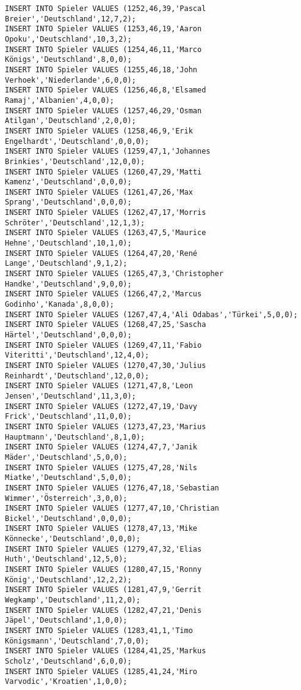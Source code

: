 \documentclass{bschlangaul-aufgabe}
\begin{document}
\begin{verbatim}
INSERT INTO Spieler VALUES (1252,46,39,'Pascal Breier','Deutschland',12,7,2);
INSERT INTO Spieler VALUES (1253,46,19,'Aaron Opoku','Deutschland',10,3,2);
INSERT INTO Spieler VALUES (1254,46,11,'Marco Königs','Deutschland',8,0,0);
INSERT INTO Spieler VALUES (1255,46,18,'John Verhoek','Niederlande',6,0,0);
INSERT INTO Spieler VALUES (1256,46,8,'Elsamed Ramaj','Albanien',4,0,0);
INSERT INTO Spieler VALUES (1257,46,29,'Osman Atilgan','Deutschland',2,0,0);
INSERT INTO Spieler VALUES (1258,46,9,'Erik Engelhardt','Deutschland',0,0,0);
INSERT INTO Spieler VALUES (1259,47,1,'Johannes Brinkies','Deutschland',12,0,0);
INSERT INTO Spieler VALUES (1260,47,29,'Matti Kamenz','Deutschland',0,0,0);
INSERT INTO Spieler VALUES (1261,47,26,'Max Sprang','Deutschland',0,0,0);
INSERT INTO Spieler VALUES (1262,47,17,'Morris Schröter','Deutschland',12,1,3);
INSERT INTO Spieler VALUES (1263,47,5,'Maurice Hehne','Deutschland',10,1,0);
INSERT INTO Spieler VALUES (1264,47,20,'René Lange','Deutschland',9,1,2);
INSERT INTO Spieler VALUES (1265,47,3,'Christopher Handke','Deutschland',9,0,0);
INSERT INTO Spieler VALUES (1266,47,2,'Marcus Godinho','Kanada',8,0,0);
INSERT INTO Spieler VALUES (1267,47,4,'Ali Odabas','Türkei',5,0,0);
INSERT INTO Spieler VALUES (1268,47,25,'Sascha Härtel','Deutschland',0,0,0);
INSERT INTO Spieler VALUES (1269,47,11,'Fabio Viteritti','Deutschland',12,4,0);
INSERT INTO Spieler VALUES (1270,47,30,'Julius Reinhardt','Deutschland',12,0,0);
INSERT INTO Spieler VALUES (1271,47,8,'Leon Jensen','Deutschland',11,3,0);
INSERT INTO Spieler VALUES (1272,47,19,'Davy Frick','Deutschland',11,0,0);
INSERT INTO Spieler VALUES (1273,47,23,'Marius Hauptmann','Deutschland',8,1,0);
INSERT INTO Spieler VALUES (1274,47,7,'Janik Mäder','Deutschland',5,0,0);
INSERT INTO Spieler VALUES (1275,47,28,'Nils Miatke','Deutschland',5,0,0);
INSERT INTO Spieler VALUES (1276,47,18,'Sebastian Wimmer','Österreich',3,0,0);
INSERT INTO Spieler VALUES (1277,47,10,'Christian Bickel','Deutschland',0,0,0);
INSERT INTO Spieler VALUES (1278,47,13,'Mike Könnecke','Deutschland',0,0,0);
INSERT INTO Spieler VALUES (1279,47,32,'Elias Huth','Deutschland',12,5,0);
INSERT INTO Spieler VALUES (1280,47,15,'Ronny König','Deutschland',12,2,2);
INSERT INTO Spieler VALUES (1281,47,9,'Gerrit Wegkamp','Deutschland',11,2,0);
INSERT INTO Spieler VALUES (1282,47,21,'Denis Jäpel','Deutschland',1,0,0);
INSERT INTO Spieler VALUES (1283,41,1,'Timo Königsmann','Deutschland',7,0,0);
INSERT INTO Spieler VALUES (1284,41,25,'Markus Scholz','Deutschland',6,0,0);
INSERT INTO Spieler VALUES (1285,41,24,'Miro Varvodic','Kroatien',1,0,0);

\end{verbatim}
\end{document}
